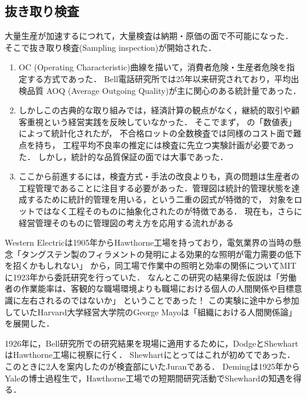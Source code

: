 \documentclass[uplatex,dvipdfmx]{jsreport}
\begin{document}
\subsection{抜き取り検査}

\begin{history}[抜き取り検査統計化の歴史]
    大量生産が加速するにつれて，大量検査は納期・原価の面で不可能になった．
    そこで抜き取り検査(Sampling inspection)が開始された．
    \begin{enumerate}
        \item OC (Operating Characteristic)曲線を描いて，消費者危険・生産者危険を指定する方式であった．
        Bell電話研究所では25年以来研究されており，平均出検品質 AOQ (Average Outgoing Quality)が主に関心のある統計量であった．
        \item しかしこの古典的な取り組みでは，経済計算の観点がなく，継続的取引や顧客重視という経営実践を反映していなかった．
        そこでまず，
        \cite{Dodge-Roming}の「数値表」によって統計化されたが，
        不合格ロットの全数検査では同様のコスト面で難点を持ち，
        工程平均不良率の推定には検査に先立つ実験計画が必要であった\cite{統計と社会経済分析2-思想と方法}．
        しかし，統計的な品質保証の面では大事であった．
        \item ここから前進するには，検査方式・手法の改良よりも，真の問題は生産者の工程管理であることに注目する必要があった．管理図は統計的管理状態を達成するために統計的管理を用いる，という二重の図式が特徴的で，
        対象をロットではなく工程そのものに抽象化されたのが特徴である．
        現在も，さらに経営管理そのものに管理図の考え方を応用する流れがある
    \end{enumerate}
\end{history}

\begin{history}[Hawthorne実験を通じた経営学との交差]
    Western Electricは1905年からHawthorne工場を持っており，電気業界の当時の懸念「タングステン製のフィラメントの発明による効果的な照明が電力需要の低下を招くかもしれない」
    から，同工場で作業中の照明と効率の関係についてMITに1923年から委託研究を行っていた．
    なんとこの研究の結果得た仮説は「労働者の作業能率は、客観的な職場環境よりも職場における個人の人間関係や目標意識に左右されるのではないか」
    ということであった！
    この実験に途中から参加していたHarvard大学経営大学院のGeorge Mayoは「組織における人間関係論」を展開した．
\end{history}

\begin{history}
    1926年に，Bell研究所での研究結果を現場に適用するために，DodgeとShewhartはHawthorne工場に視察に行く．
    Shewhartにとってはこれが初めてであった．
    このときに2人を案内したのが検査部にいたJuranである．
    Demingは1925年からYaleの博士過程生で，Hawthorne工場での短期間研究活動でShewhardの知遇を得る．
\end{history}
\end{document}
